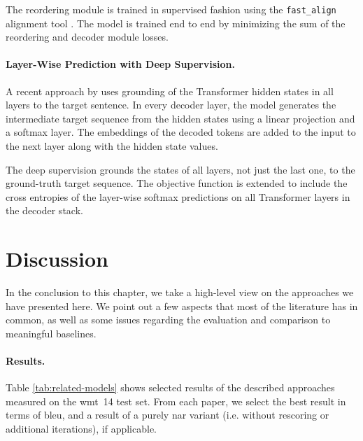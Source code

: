 The reordering module is trained in supervised fashion using the
\texttt{fast\_align} alignment tool \citep{dyer-etal-2013-simple}. The model is
trained end to end by minimizing the sum of the reordering and decoder module
losses.

\paragraph{Layer-Wise Prediction with Deep Supervision.}  %
A recent approach by \citet{huang-etal-2021-nonautoregressive} uses grounding
of the Transformer hidden states in all layers to the target sentence.  In
every decoder layer, the model generates the intermediate target sequence from
the hidden states using a linear projection and a softmax layer. The embeddings
of the decoded tokens are added to the input to the next layer along with the
hidden state values.

The deep supervision grounds the states of all layers, not just the last one,
to the ground-truth target sequence. The objective function is extended to
include the cross entropies of the layer-wise softmax predictions on all
Transformer layers in the decoder stack.


\section{Discussion}%
\label{sec:nat:discussion}

In the conclusion to this chapter, we take a high-level view on the approaches
we have presented here. We point out a few aspects that most of the literature
has in common, as well as some issues regarding the evaluation and comparison
to meaningful baselines.

\paragraph{Results.} Table \ref{tab:related-models} shows selected results of
the described approaches measured on the \acs{wmt}~14 test set. From each
paper, we select the best result in terms of \acs{bleu}, and a result of a
purely \acl{nar} variant (i.e. without rescoring or additional iterations), if
applicable.

